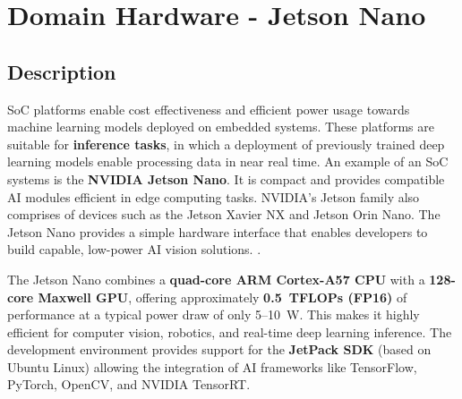 %




\def \globalscale {0.5500000}


\chapter{Domain Hardware - Jetson Nano}


\section{Description}
\label{subsec:description}

\ac{SoC} platforms enable cost effectiveness and efficient power usage towards machine learning models deployed on embedded systems. 
These platforms are suitable for \textbf{inference tasks}, in which a deployment of previously trained deep learning models enable processing data in near real time.   
An example of an \ac{SoC} systems is the \textbf{NVIDIA Jetson Nano}. It is compact and provides compatible \ac{AI} modules efficient in edge computing tasks. 
NVIDIA’s Jetson family also comprises of devices such as the Jetson Xavier NX and Jetson Orin Nano. The Jetson Nano provides a simple hardware interface that enables developers to build capable, low-power \ac{AI} vision solutions. \cite{jetsonNanoDatasheet, JetsonGettingStarted:2019}.

\bigskip

The Jetson Nano combines a \textbf{quad-core ARM Cortex-A57 CPU} with a \textbf{128-core Maxwell \ac{GPU}}, offering approximately \textbf{0.5~TFLOPs (FP16)} of performance at a typical power draw of only 5–10~W. 
This makes it highly efficient for computer vision, robotics, and real-time deep learning inference. 
The development environment provides support for the \textbf{JetPack SDK} (based on Ubuntu Linux) allowing the integration  of \ac{AI} frameworks like TensorFlow, PyTorch, OpenCV, and NVIDIA TensorRT.

